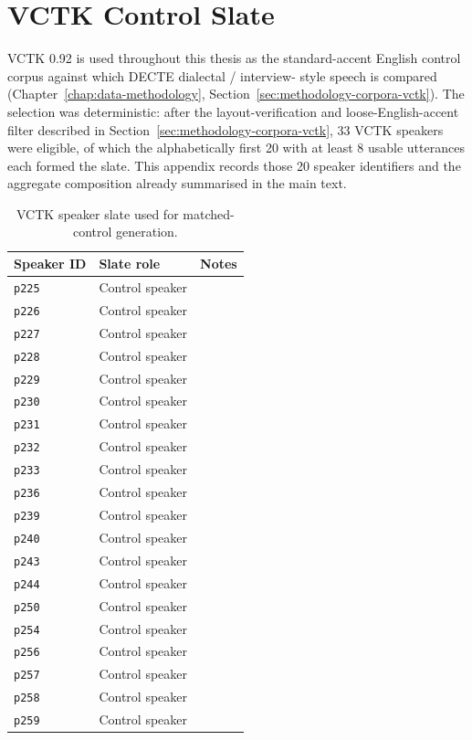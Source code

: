\cleardoubleoddpage
\chapter{VCTK Control Slate}
\label{app:vctk-slate}

VCTK 0.92 is used throughout this thesis as the standard-accent
English control corpus against which DECTE dialectal / interview-%
style speech is compared (Chapter~\ref{chap:data-methodology}, Section~\ref{sec:methodology-corpora-vctk}).
The selection was deterministic: after the layout-verification and
loose-English-accent filter described in Section~\ref{sec:methodology-corpora-vctk},
33 VCTK speakers were eligible, of which the alphabetically first
20 with at least 8 usable utterances each formed the slate. This
appendix records those 20 speaker identifiers and the aggregate
composition already summarised in the main text.

\begin{table}[t]
\centering
\caption{VCTK speaker slate used for matched-control generation.}
\label{tab:appendix-vctk-speaker-slate}
\small
\setlength{\tabcolsep}{6pt}
\begin{tabularx}{\linewidth}{@{}l l X@{}}
\toprule
\textbf{Speaker ID} & \textbf{Slate role} & \textbf{Notes} \\
\midrule
\texttt{p225} & Control speaker &  \\
\texttt{p226} & Control speaker &  \\
\texttt{p227} & Control speaker &  \\
\texttt{p228} & Control speaker &  \\
\texttt{p229} & Control speaker &  \\
\texttt{p230} & Control speaker &  \\
\texttt{p231} & Control speaker &  \\
\texttt{p232} & Control speaker &  \\
\texttt{p233} & Control speaker &  \\
\texttt{p236} & Control speaker &  \\
\texttt{p239} & Control speaker &  \\
\texttt{p240} & Control speaker &  \\
\texttt{p243} & Control speaker &  \\
\texttt{p244} & Control speaker &  \\
\texttt{p250} & Control speaker &  \\
\texttt{p254} & Control speaker &  \\
\texttt{p256} & Control speaker &  \\
\texttt{p257} & Control speaker &  \\
\texttt{p258} & Control speaker &  \\
\texttt{p259} & Control speaker &  \\
\bottomrule
\end{tabularx}
\end{table}

